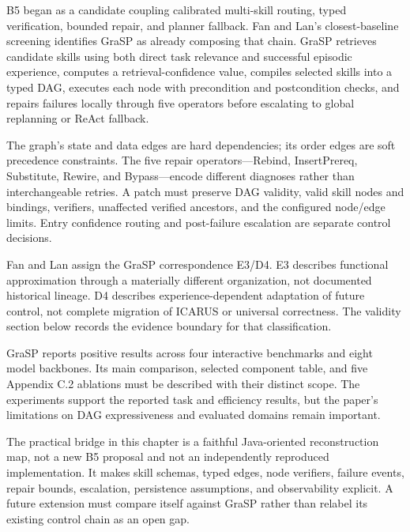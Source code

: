 \begin{chapterrecap}
B5 began as a candidate coupling calibrated multi-skill routing, typed verification, bounded repair, and planner fallback. Fan and Lan's closest-baseline screening identifies GraSP as already composing that chain. GraSP retrieves candidate skills using both direct task relevance and successful episodic experience, computes a retrieval-confidence value, compiles selected skills into a typed DAG, executes each node with precondition and postcondition checks, and repairs failures locally through five operators before escalating to global replanning or ReAct fallback.

The graph's state and data edges are hard dependencies; its order edges are soft precedence constraints. The five repair operators—Rebind, InsertPrereq, Substitute, Rewire, and Bypass—encode different diagnoses rather than interchangeable retries. A patch must preserve DAG validity, valid skill nodes and bindings, verifiers, unaffected verified ancestors, and the configured node/edge limits. Entry confidence routing and post-failure escalation are separate control decisions.

Fan and Lan assign the GraSP correspondence E3/D4. E3 describes functional approximation through a materially different organization, not documented historical lineage. D4 describes experience-dependent adaptation of future control, not complete migration of ICARUS or universal correctness. The validity section below records the evidence boundary for that classification.

GraSP reports positive results across four interactive benchmarks and eight model backbones. Its main comparison, selected component table, and five Appendix C.2 ablations must be described with their distinct scope. The experiments support the reported task and efficiency results, but the paper's limitations on DAG expressiveness and evaluated domains remain important.

The practical bridge in this chapter is a faithful Java-oriented reconstruction map, not a new B5 proposal and not an independently reproduced implementation. It makes skill schemas, typed edges, node verifiers, failure events, repair bounds, escalation, persistence assumptions, and observability explicit. A future extension must compare itself against GraSP rather than relabel its existing control chain as an open gap.
\end{chapterrecap}

